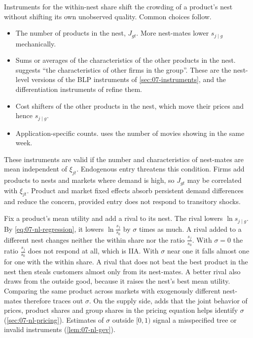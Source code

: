 Instruments for the within-nest share shift the crowding of a product's nest without shifting its own unobserved
quality. Common choices follow.
\begin{itemize}
  \item The number of products in the nest, $J_{gt}$. More nest-mates lower $s_{j \mid g}$ mechanically.
  \item Sums or averages of the characteristics of the other products in the nest. \citet[p.~254]{Berry1994}
  suggests ``the characteristics of other firms in the group''. These are the nest-level versions of the BLP
  instruments of \cref{sec:07-instruments}, and the differentiation instruments of \citet{GandhiHoude2019}
  refine them.
  \item Cost shifters of the other products in the nest, which move their prices and hence $s_{j \mid g}$.
  \item Application-specific counts. \citet{Einav2007} uses the number of movies showing in the same week.
\end{itemize}
These instruments are valid if the number and characteristics of nest-mates are mean independent of $\xi_{jt}$.
Endogenous entry threatens this condition. Firms add products to nests and markets where demand is high, so
$J_{gt}$ may be correlated with $\xi_{jt}$. Product and market fixed effects absorb persistent demand differences
and reduce the concern, provided entry does not respond to transitory shocks.

Fix a product's mean utility and add a rival to its nest. The rival lowers $\ln s_{j \mid g}$. By
\eqref{eq:07-nl-regression}, it lowers $\ln\frac{s_j}{s_0}$ by $\sigma$ times as much. A rival added to a different
nest changes neither the within share nor the ratio $\frac{s_j}{s_0}$. With $\sigma = 0$ the ratio $\frac{s_j}{s_0}$ does not respond at all, which is IIA. With
$\sigma$ near one it falls almost one for one with the within share. A rival that does not beat the best product in
the nest then steals customers almost only from its nest-mates. A better rival also draws from the outside good,
because it raises the nest's best mean utility. Comparing the same product across markets with exogenously different nest-mates therefore traces out
$\sigma$. On the supply side, \citet[pp.~255--256]{Berry1994} adds that the joint behavior of prices, product shares
and group shares in the pricing equation helps identify $\sigma$ (\cref{sec:07-nl-pricing}). Estimates of
$\sigma$ outside $[0, 1)$ signal a misspecified tree or invalid instruments (\cref{lem:07-nl-gev}).

